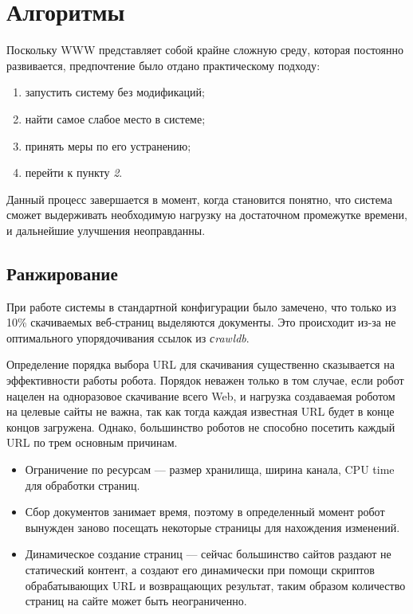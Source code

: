 \chapter{Алгоритмы}
Поскольку WWW представляет собой крайне сложную среду, которая постоянно развивается, предпочтение было отдано практическому подходу\cite{blinkov}:
\begin{enumerate}
 \item запустить систему без модификаций;
 \item найти самое слабое место в системе;
 \item принять меры по его устранению;
 \item перейти к пункту \textit{2}.
\end{enumerate}

Данный процесс завершается в момент, когда становится понятно, что система сможет выдерживать необходимую нагрузку на достаточном промежутке времени, и дальнейшие улучшения неоправданны.
\section{Ранжирование}
При работе системы в стандартной конфигурации было замечено, что только из 10\% скачиваемых веб-страниц выделяются документы. Это происходит из-за не оптимального упорядочивания ссылок из \textit{сrawldb}.

Определение порядка выбора URL для скачивания существенно сказывается на эффективности работы робота.\cite{crawl}\cite{focused}\cite{opic} Порядок неважен только в том случае, если робот нацелен на одноразовое скачивание всего Web, и нагрузка создаваемая роботом на целевые сайты не важна, так как тогда каждая известная URL будет в конце концов загружена. Однако, большинство роботов не способно посетить каждый URL по трем основным причинам.
\begin{itemize}
 \item Ограничение по ресурсам --- размер хранилища, ширина канала, CPU time для обработки страниц.
 \item Сбор документов занимает время, поэтому в определенный момент робот вынужден заново посещать некоторые страницы для нахождения изменений.
 \item Динамическое создание страниц --- сейчас большинство сайтов раздают не статический контент, а создают его динамически при помощи скриптов обрабатывающих URL и возвращающих результат, таким образом количество страниц на сайте может быть неограниченно.
\end{itemize}

